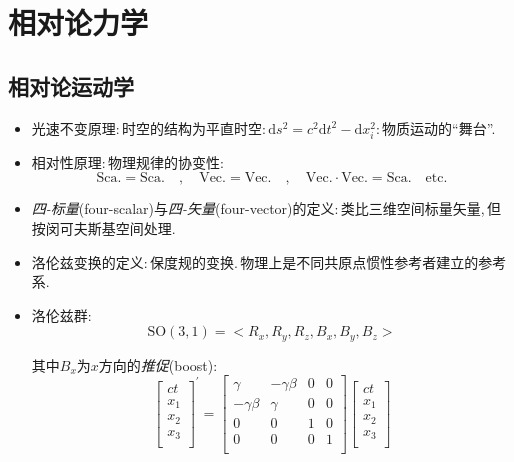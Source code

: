 \chapter{相对论力学}


\section{相对论运动学}

\begin{itemize}
\item 光速不变原理:\,时空的结构为平直时空:\,$\text{d}s^2=c^2\text{d}t^2-\text{d}x_i^2$:\,物质运动的``舞台''.

\item 相对性原理:\,物理规律的协变性:
\[\text{Sca}.=\text{Sca}. \quad , \quad \text{Vec}.=\text{Vec}. \quad ,\quad  \text{Vec}.\cdot \text{Vec}.=\text{Sca}. \quad \text{etc}.\]

\item \emph{四-标量}(four-scalar)与\emph{四-矢量}(four-vector)的定义:\,类比三维空间标量矢量,\,但按闵可夫斯基空间处理.

\item 洛伦兹变换的定义:\,保度规的变换.\,物理上是不同共原点惯性参考者建立的参考系.

\item 洛伦兹群:
\[\text{SO}\left( 3,1 \right) =<R_x, R_y, R_z, B_x, B_y, B_z>\]

其中$B_x$为$x$方向的\emph{推促}(boost):
\[\left[ \begin{array}{c}
	ct\\
	x_1\\
	x_2\\
	x_3\\
\end{array} \right] ^{'} =\left[ \begin{matrix}
	\gamma&		-\gamma \beta&		0&		0\\
	-\gamma \beta&		\gamma&		0&		0\\
	0&		0&		1&		0\\
	0&		0&		0&		1\\
\end{matrix} \right] \left[ \begin{array}{c}
	ct\\
	x_1\\
	x_2\\
	x_3\\
\end{array} \right] \]


\end{itemize}
